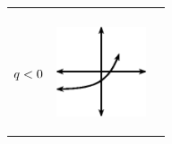 \begin{center}
\begin{xtabular*}{\mytablewidth}[t]{|p{10\mystarwidth}|p{10\mystarwidth}|p{10\mystarwidth}|}
\begin{center}
      \vspace{2pt}
    \vspace{.1in}
    
    \end{center}



    \addtocounter{footnote}{-0}
    
     \tabularnewline{}
    
    
        
                  \begin{math}q<{}0\end{math}
                 &
    
    
        
                  
    \setcounter{subfigure}{0}

\label{m39348*id250596}
    \begin{center}
    \label{m39348*id250596!!!underscore!!!media}\label{m39348*id250596!!!underscore!!!printimage}\includegraphics[width=100px]{col11306.imgs/m39348_MG10C11_030.png} %
        
      \vspace{2pt}
    \vspace{.1in}
    
    \end{center}



    \addtocounter{footnote}{-0}
    
                 &
    
    

\end{xtabular*}
\end{center}
